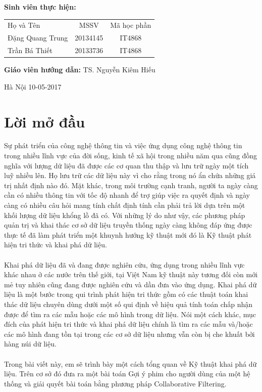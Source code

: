 \documentclass[a4paper,10pt]{report}
\begin{document}
\hspace{1cm}\fontsize{14}{16}\selectfont \textbf{Sinh viên thực hiện:}
\begin{longtable}{l c c }
Họ và Tên & MSSV &    Mã học phần \\[0.5cm]
Đặng Quang Trung &    20134145 & IT4868\\
Trần Bá Thiết & 20133736 &IT4868
\end{longtable}
\hspace{0.3cm}\fontsize{14}{16}\selectfont \textbf{Giáo viên hướng dẫn:} TS. Nguyễn Kiêm Hiếu\\[1.0cm]
\begin{center}
\fontsize{16}{19}\selectfont Hà Nội 10-05-2017
\end{center} 
\tableofcontents
\chapter*{Lời mở đầu}
Sự phát triển của công nghệ thông tin và việc ứng dụng công nghệ thông tin trong nhiều
lĩnh vực của đời sống, kinh tế xã hội trong nhiều năm qua cũng đồng nghĩa với lượng dữ
liệu đã được các cơ quan thu thập và lưu trữ ngày một tích luỹ nhiều lên. Họ lưu trữ các
dữ liệu này vì cho rằng trong nó ẩn chứa những giá trị nhất định nào đó. Mặt khác, trong
môi trường cạnh tranh, người ta ngày càng cần có nhiều thông tin với tốc độ nhanh để trợ
giúp việc ra quyết định và ngày càng có nhiều câu hỏi mang tính chất định tính cần phải
trả lời dựa trên một khối lượng dữ liệu khổng lồ đã có. Với những lý do như vậy, các
phương pháp quản trị và khai thác cơ sở dữ liệu truyền thống ngày càng không đáp ứng
được thực tế đã làm phát triển một khuynh hướng kỹ thuật mới đó là Kỹ thuật phát hiện
tri thức và khai phá dữ liệu. \\ \\ 
Khai phá dữ liệu đã và đang được nghiên cứu, ứng dụng trong nhiều lĩnh vực khác nhau
ở các nước trên thế giới, tại Việt Nam kỹ thuật này tương đối còn mới mẻ tuy nhiên cũng
đang được nghiên cứu và dần đưa vào ứng dụng. Khai phá dữ liệu là một bước trong qui
trình phát hiện tri thức gồm có các thuật toán khai thác dữ liệu chuyên dùng dưới một số
qui định về hiệu quả tính toán chấp nhận được để tìm ra các mẫu hoặc các mô hình trong
dữ liệu. Nói một cách khác, mục đích của phát hiện tri thức và khai phá dữ liệu chính là
tìm ra các mẫu và/hoặc các mô hình đang tồn tại trong các cơ sở dữ liệu nhưng vẫn còn bị
che khuất bởi hàng núi dữ liệu. \\ \\ 
Trong bài viết này, em sẽ trình bày một cách tổng quan về Kỹ thuật khai phá dữ liệu.
Trên cơ sở đó đưa ra một bài toán Gợi ý phim cho người dùng của một hệ thống và giải
quyết bài toán bằng phương pháp Collaborative Filtering. 
\end{document}
